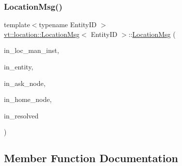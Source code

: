 \mbox{\label{structvt_1_1location_1_1_location_msg_a1b7a6d54ba2fe0018480ca50475e8a66}} 
\subsubsection{\texorpdfstring{Location\+Msg()}{LocationMsg()}\hspace{0.1cm}{\footnotesize\ttfamily [2/2]}}
{\footnotesize\ttfamily template$<$typename Entity\+ID $>$ \\
\hyperlink{structvt_1_1location_1_1_location_msg}{vt\+::location\+::\+Location\+Msg}$<$ Entity\+ID $>$\+::\hyperlink{structvt_1_1location_1_1_location_msg}{Location\+Msg} (\begin{DoxyParamCaption}\item[{\hyperlink{namespacevt_1_1location_a4db6456e8024af2d23fc5ae560fef866}{Loc\+Inst\+Type} const \&}]{in\+\_\+loc\+\_\+man\+\_\+inst,  }\item[{Entity\+ID const \&}]{in\+\_\+entity,  }\item[{\hyperlink{namespacevt_a866da9d0efc19c0a1ce79e9e492f47e2}{Node\+Type} const \&}]{in\+\_\+ask\+\_\+node,  }\item[{\hyperlink{namespacevt_a866da9d0efc19c0a1ce79e9e492f47e2}{Node\+Type} const \&}]{in\+\_\+home\+\_\+node,  }\item[{\hyperlink{namespacevt_a866da9d0efc19c0a1ce79e9e492f47e2}{Node\+Type}}]{in\+\_\+resolved }\end{DoxyParamCaption})\hspace{0.3cm}{\ttfamily [inline]}}



\subsection{Member Function Documentation}
\mbox{\label{structvt_1_1location_1_1_location_msg_a98f01158208640bb88e0d4583694f9bb}} 
